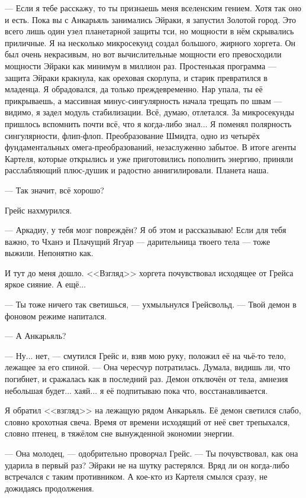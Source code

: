 --- Если я тебе расскажу, то ты признаешь меня вселенским гением.
Хотя так оно и есть.
Пока вы с Анкарьяль занимались Эйраки, я запустил Золотой город.
Это всего лишь один узел планетарной защиты тси, но мощности в нём скрывались приличные.
Я на несколько микросекунд создал большого, жирного хоргета.
Он был очень некрасивым, но вот вычислительные мощности его превосходили мощности Эйраки как минимум в миллион раз.
Простенькая программа --- защита Эйраки кракнула, как ореховая скорлупа, и старик превратился в младенца.
Я обрадовался, да только преждевременно.
Нар упала, ты её прикрываешь, а массивная минус-сингулярность начала трещать по швам --- видимо, я задел модуль стабилизации.
Всё, думаю, отлетался.
За микросекунды пришлось вспомнить почти всё, что я когда-либо знал...
Я поменял полярность сингулярности, флип-флоп.
Преобразование Шмидта, одно из четырёх фундаментальных омега-преобразований, незаслуженно забытое.
В итоге агенты Картеля, которые открылись и уже приготовились пополнить энергию, приняли расслабляющий плюс-душик и радостно аннигилировали.
Планета наша.

--- Так значит, всё хорошо?

Грейс нахмурился.

--- Аркадиу, у тебя мозг повреждён?
Я об этом и рассказываю!
Если для тебя важно, то Чханэ и Плачущий Ягуар --- дарительница твоего тела --- тоже выжили.
Непонятно как.

И тут до меня дошло.
<<Взгляд>> хоргета почувствовал исходящее от Грейса яркое сияние.
А ещё...

--- Ты тоже ничего так светишься, --- ухмыльнулся Грейсвольд.
--- Твой демон в фоновом режиме напитался.

--- А Анкарьяль?

--- Ну... нет, --- смутился Грейс и, взяв мою руку, положил её на чьё-то тело, лежащее за его спиной.
--- Она чересчур потратилась.
Думала, видишь ли, что погибнет, и сражалась как в последний раз.
Демон отключён от тела, амнезия небольшая будет... хаяй... я её подпитываю пока что, восстанавливается.

Я обратил <<взгляд>> на лежащую рядом Анкарьяль.
Её демон светился слабо, словно крохотная свеча.
Время от времени исходящий от неё свет трепыхался, словно птенец, в тяжёлом сне вынужденной экономии энергии.

--- Она молодец, --- одобрительно проворчал Грейс.
--- Ты почувствовал, как она ударила в первый раз?
Эйраки не на шутку растерялся.
Вряд ли он когда-либо встречался с таким противником.
А кое-кто из Картеля смылся сразу, не дожидаясь продолжения.

